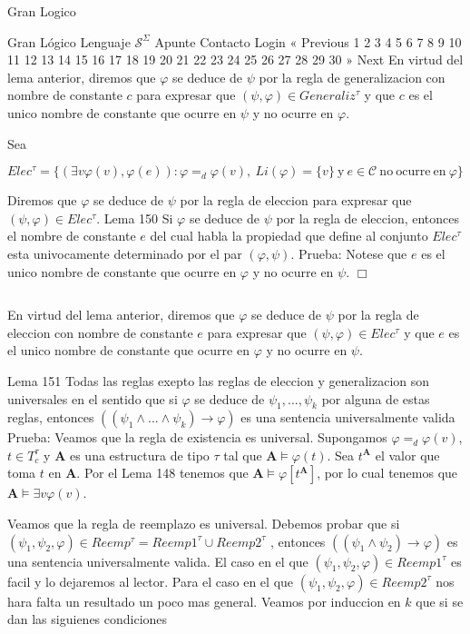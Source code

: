 Gran Logico

Gran Lógico
Lenguaje \(\mathcal{S}^{\Sigma }\)
Apunte
Contacto
Login
« Previous
1
2
3
4
5
6
7
8
9
10
11
12
13
14
15
16
17
18
19
20
21
22
23
24
25
26
27
28
29
30
» Next
En virtud del lema anterior, diremos que \(\varphi \) se deduce de \( \psi \) por la regla de generalizacion con nombre de constante \(c\) para expresar que \((\psi ,\varphi )\in Generaliz^{\tau }\) y que \(c\) es el unico nombre de constante que ocurre en \(\psi \) y no ocurre en \(\varphi \).

Sea

\(\displaystyle Elec^{\tau }=\{(\exists v\varphi (v),\varphi (e)):\varphi =_{d}\varphi (v),\ Li(\varphi )=\{v\}\ \mathrm{y\ }e\in \mathcal{C}\ \mathrm{no\ ocurre\ en}\ \varphi \} \)

Diremos que \(\varphi \) se deduce de \(\psi \) por la regla de eleccion para expresar que \((\psi ,\varphi )\in Elec^{\tau }\).
Lema 150 Si \(\varphi \) se deduce de \(\psi \) por la regla de eleccion, entonces el nombre de constante \(e\) del cual habla la propiedad que define al conjunto \( Elec^{\tau }\) esta univocamente determinado por el par \((\varphi ,\psi )\).
Prueba: Notese que \(e\) es el unico nombre de constante que ocurre en \(\varphi \) y no ocurre en \(\psi \). \(\Box\)

\( \)

En virtud del lema anterior, diremos que \(\varphi \) se deduce de \( \psi \) por la regla de eleccion con nombre de constante \(e\) para expresar que \((\psi ,\varphi )\in Elec^{\tau }\) y que \(e\) es el unico nombre de constante que ocurre en \(\varphi \) y no ocurre en \(\psi \).

Lema 151 Todas las reglas exepto las reglas de eleccion y generalizacion son universales en el sentido que si \(\varphi \) se deduce de \(\psi _{1},...,\psi _{k}\) por alguna de estas reglas, entonces \(\left( (\psi _{1}\wedge ...\wedge \psi _{k})\rightarrow \varphi \right) \) es una sentencia universalmente valida
Prueba: Veamos que la regla de existencia es universal. Supongamos \(\varphi =_{d}\varphi (v)\), \(t\in T_{c}^{\tau }\) y \(\mathbf{A}\) es una estructura de tipo \(\tau \) tal que \(\mathbf{A}\models \varphi (t)\). Sea \(t^{\mathbf{A}}\) el valor que toma \(t\) en \(\mathbf{A}\). Por el Lema 148 tenemos que \(\mathbf{A}\models \varphi \left[ t^{\mathbf{A}}\right] \), por lo cual tenemos que \(\mathbf{A}\models \exists v\varphi (v)\).

Veamos que la regla de reemplazo es universal. Debemos probar que si \((\psi _{1},\psi _{2},\varphi )\in Reemp^{\tau }=Reemp1^{\tau }\cup Reemp2^{\tau }\) , entonces \(\left( (\psi _{1}\wedge \psi _{2})\rightarrow \varphi \right) \) es una sentencia universalmente valida. El caso en el que \((\psi _{1},\psi _{2},\varphi )\in Reemp1^{\tau }\) es facil y lo dejaremos al lector. Para el caso en el que \((\psi _{1},\psi _{2},\varphi )\in Reemp2^{\tau }\) nos hara falta un resultado un poco mas general. Veamos por induccion en \(k\) que si se dan las siguienes condiciones

